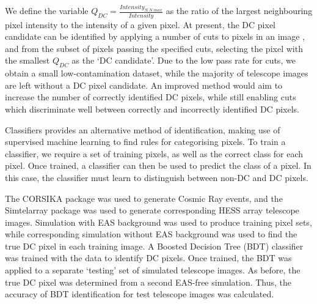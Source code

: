 \documentclass[]{article}
\begin{document}
We define the variable $Q_{DC} = \frac{Intensity_{N.N.max}}{Intensity}$ as the ratio of the largest neighbouring pixel intensity to the intensity of a given pixel. At present, the DC pixel candidate can be identified by applying a number of cuts to pixels in an image \cite{hess07}, and from the subset of pixels passing the specified cuts, selecting the pixel with the smallest $Q_{DC}$ as the \textquoteleft DC candidate'. Due to the low pass rate for cuts, we obtain a small low-contamination dataset, while the majority of telescope images are left without a DC pixel candidate. An improved method would aim to increase the number of correctly identified DC pixels, while still enabling cuts which discriminate well between correctly and incorrectly identified DC pixels.

Classifiers provides an alternative method of identification, making use of supervised machine learning to find rules for categorising pixels. To train a classifier, we require a set of training pixels, as well as the correct class for each pixel. Once trained, a classifier can then be used to predict the class of a pixel. In this case, the classifier must learn to distinguish between non-DC and DC pixels. 

The CORSIKA package \cite{Heck98} was used to generate Cosmic Ray events, and the Sim\textunderscore telarray package  \cite{Bernlohr08} was used to generate corresponding HESS array telescope images.  Simulation with EAS background was used to produce training pixel sets, while corresponding simulation without EAS background was used to find the true DC pixel in each training image. A Boosted Decision Tree (BDT) classifier was trained with the data to identify DC pixels. Once trained, the BDT was applied to a separate \textquoteleft testing' set of simulated telescope images. As before, the true DC pixel was determined from a second EAS-free simulation. Thus, the accuracy of BDT identification for test telescope images was calculated.
\end{document}
